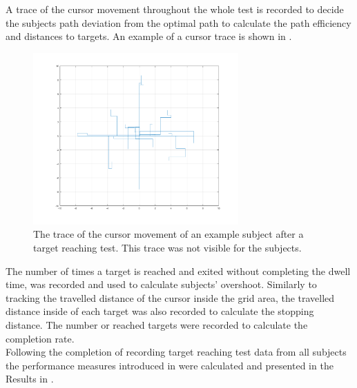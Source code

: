 A trace of the cursor movement throughout the whole test is recorded to decide the subjects path deviation from the optimal path to calculate the path efficiency and distances to targets. An example of a cursor trace is shown in . 

\begin{figure}[H] 
	\includegraphics[width=0.7\textwidth]{figures/pMethods/trajectory}
	\caption{The trace of the cursor movement of an example subject after a target reaching test. This trace was not visible for the subjects.}
	\label{fig:cursorTrace}
\end{figure}
The number of times a target is reached and exited without completing the dwell time, was recorded and used to calculate subjects' overshoot. Similarly to tracking the travelled distance of the cursor inside the grid area, the travelled distance inside of each target was also recorded to calculate the stopping distance. The number or reached targets were recorded to calculate the completion rate. \\ %
Following the completion of recording target reaching test data from all subjects the performance measures introduced in  were calculated and presented in the Results in .




